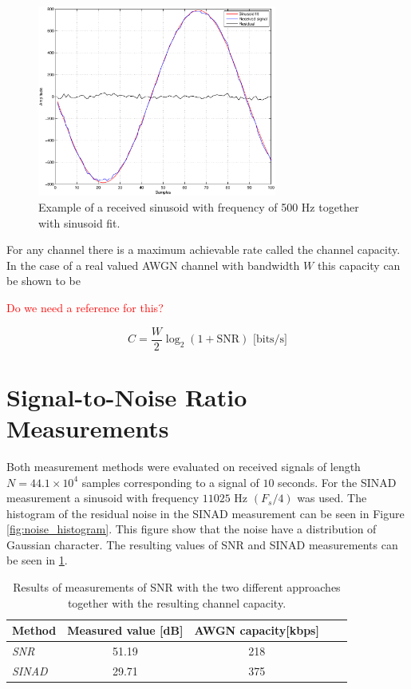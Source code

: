 \documentclass[12pt,a4paper,openright]{report}
\begin{document}
\begin{figure}[H]
  \centering
    \includegraphics[width=0.7\textwidth]{sinusoid_fit.eps}
    \caption[BFSK example]{Example of a received sinusoid with frequency of 500 Hz together with sinusoid fit.}
    \label{fig:sinusoid_fit}
\end{figure}

For any channel there is a maximum achievable rate called the channel capacity. In the case of a real valued AWGN channel with bandwidth \(W\) this capacity can be shown to be

\textcolor{red}{Do we need a reference for this?}%

\begin{equation}\label{Eq:awgn_capacity} C = \frac{W}{2}\log_2(1+\text{SNR})\text{                [bits/s]}\end{equation}



\section{Signal-to-Noise Ratio Measurements}

Both measurement methods were evaluated on received signals of length \(N = 44.1\times10^4\) samples corresponding to a signal of \(10\) seconds. For the SINAD measurement a sinusoid with frequency \(11025\) Hz \((F_s/4)\) was used. The histogram of the residual noise in the SINAD measurement can be seen in Figure \ref{fig:noise_histogram}. This figure show that the noise have a distribution of Gaussian character. The resulting values of SNR and SINAD measurements can be seen in \ref{table:snr}.


\begin{table} [h]
\centering
\begin{tabular}{lcccc} 
\bf{Method}	& \bf{Measured value }\textnormal{[dB]}    & \bf{AWGN capacity}\textnormal{[kbps]} \\
\hline
\emph{SNR}           & 51.19           & 218       \\
\emph{SINAD}        & 29.71           & 375           \\
\end{tabular}
\caption[Result of signal-to-noise ratio measurements]{Results of measurements of SNR with the two different approaches together with the resulting channel capacity.}
\label{table:snr}
\end{table}
\end{document}
